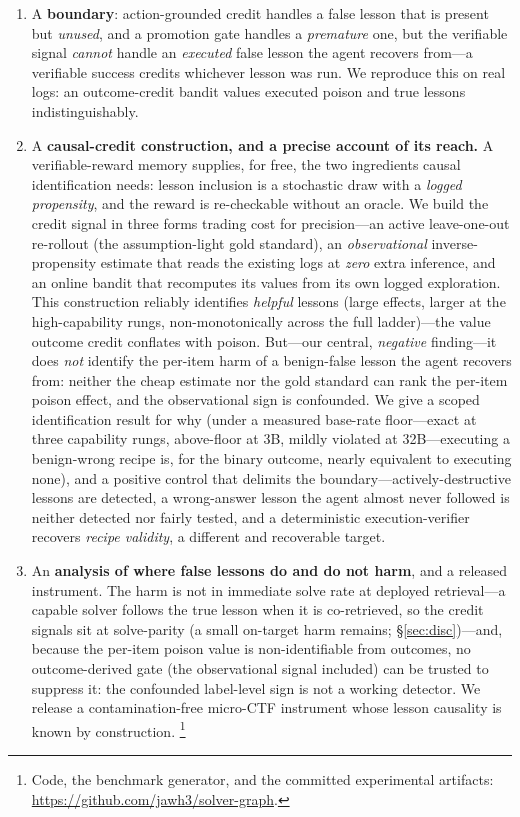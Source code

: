 \documentclass[10pt,twocolumn]{article}
\begin{document}
\begin{enumerate}\itemsep2pt
\item A \textbf{boundary}: action-grounded credit handles a false lesson that is
  present but \emph{unused}, and a promotion gate handles a \emph{premature} one, but
  the verifiable signal \emph{cannot} handle an \emph{executed} false lesson the
  agent recovers from---a verifiable success credits whichever lesson was run. We
  reproduce this on real logs: an outcome-credit bandit values executed poison and
  true lessons indistinguishably.
\item A \textbf{causal-credit construction, and a precise account of its reach.} A
  verifiable-reward memory supplies, for free, the two ingredients causal
  identification needs: lesson inclusion is a stochastic draw with a \emph{logged
  propensity}, and the reward is re-checkable without an oracle. We build the credit
  signal in three forms trading cost for precision---an active leave-one-out
  re-rollout (the assumption-light gold standard), an \emph{observational}
  inverse-propensity estimate that reads the existing logs at \emph{zero} extra
  inference, and an online bandit that recomputes its values from its own logged
  exploration. This construction reliably identifies \emph{helpful} lessons (large
  effects, larger at the high-capability rungs, non-monotonically across the full
  ladder)---the value outcome credit conflates with poison.
  But---our central, \emph{negative} finding---it does \emph{not} identify the per-item
  harm of a benign-false lesson the agent recovers from: neither the cheap estimate nor
  the gold standard can rank the per-item poison effect, and the observational sign is
  confounded. We give a scoped identification result for why (under a measured
  base-rate floor---exact at three capability rungs, above-floor at 3B, mildly violated at
  32B---executing a
  benign-wrong recipe is, for the binary outcome, nearly equivalent to executing none),
  and a positive control that delimits the
  boundary---actively-destructive lessons are detected, a wrong-answer lesson the agent
  almost never followed is neither detected nor fairly tested, and a deterministic
  execution-verifier recovers \emph{recipe validity}, a different and recoverable target.
\item An \textbf{analysis of where false lessons do and do not harm}, and a released
  instrument. The harm is not in immediate solve rate at deployed retrieval---a capable
  solver follows the true lesson when it is co-retrieved, so the credit signals sit at
  solve-parity (a small on-target harm remains;
  \S\ref{sec:disc})---and,
  because the per-item poison value is non-identifiable from outcomes, no
  outcome-derived gate (the observational signal included) can be trusted to suppress
  it: the confounded label-level sign is not a working detector. We release a
  contamination-free micro-CTF instrument whose lesson causality is known by
  construction.%
  \footnote{Code, the benchmark generator, and the committed experimental
  artifacts: \url{https://github.com/jawh3/solver-graph}.}
\end{enumerate}
\end{document}
